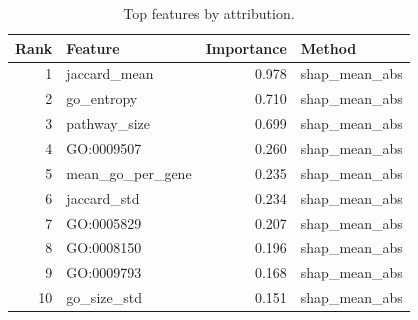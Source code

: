 \begin{table}[htbp]
\centering
\caption{Top features by attribution.}
\label{tab:top_features_recomputed}
\begin{tabular}{rlrl}
\toprule
Rank & Feature & Importance & Method \\
\midrule
1 & jaccard\_mean & 0.978 & shap\_mean\_abs \\
2 & go\_entropy & 0.710 & shap\_mean\_abs \\
3 & pathway\_size & 0.699 & shap\_mean\_abs \\
4 & GO:0009507 & 0.260 & shap\_mean\_abs \\
5 & mean\_go\_per\_gene & 0.235 & shap\_mean\_abs \\
6 & jaccard\_std & 0.234 & shap\_mean\_abs \\
7 & GO:0005829 & 0.207 & shap\_mean\_abs \\
8 & GO:0008150 & 0.196 & shap\_mean\_abs \\
9 & GO:0009793 & 0.168 & shap\_mean\_abs \\
10 & go\_size\_std & 0.151 & shap\_mean\_abs \\
\bottomrule
\end{tabular}

\end{table}
